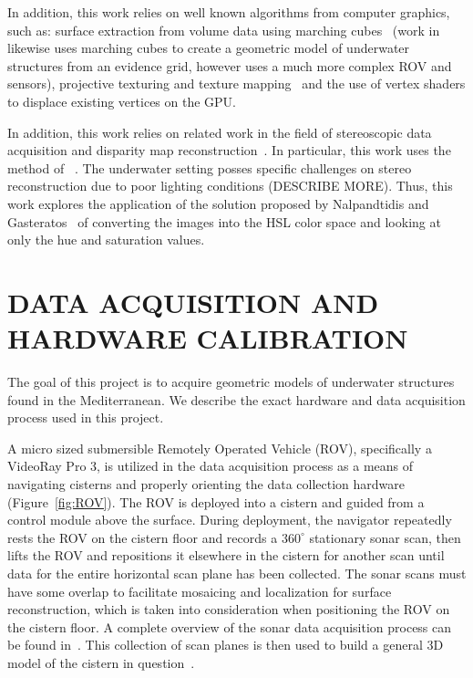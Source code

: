 \documentclass[a4paper,twoside]{article}
\begin{document}
In addition, this work relies on well known algorithms from computer graphics, such as: surface extraction from volume data using marching cubes~\cite{Lorensen} (work in ~\cite{Fairfield:2010} likewise uses marching cubes to create a geometric model of underwater structures from an evidence grid, however uses a much more complex ROV and sensors), projective texturing and texture mapping~\cite{Williams78castingcurved,Segal} and the use of vertex shaders to displace existing vertices on the GPU.

In addition, this work relies on related work in the field of stereoscopic data acquisition and disparity map reconstruction~\cite{}.  In particular, this work uses the method of ~\cite{stereo:zitKan}.  The underwater setting posses specific challenges on stereo reconstruction due to poor lighting conditions (DESCRIBE MORE).  Thus, this work explores the application of the solution proposed by Nalpandtidis and Gasteratos~\cite{nalGast}  of  converting the images into the HSL color space and looking at only the hue and saturation values. 


\section{\uppercase{Data Acquisition and Hardware Calibration}}
\label{sec:data}

\noindent The goal of this project is to acquire geometric models of underwater structures found in the Mediterranean.  We describe the exact hardware and data acquisition process used in this project.

A micro sized submersible Remotely Operated Vehicle (ROV), specifically a VideoRay Pro 3, is utilized in the data acquisition process as a means of navigating cisterns and properly orienting the data collection hardware (Figure~\ref{fig:ROV}). The ROV is deployed into a cistern and guided from a control module above the surface. During deployment, the navigator repeatedly rests the ROV on the cistern floor and records a $360^{\circ}$ stationary sonar scan, then lifts the ROV and repositions it elsewhere in the cistern for another scan until data for the entire horizontal scan plane has been collected. The sonar scans must have some overlap to facilitate mosaicing and localization for surface reconstruction, which is taken into consideration when positioning the ROV on the cistern floor. A complete overview of the sonar data acquisition process can be found in~\cite{ClarkVast}.  This collection of scan planes is then used to build a general 3D model of the cistern in question~\cite{ICEX11}.
  
\end{document}
